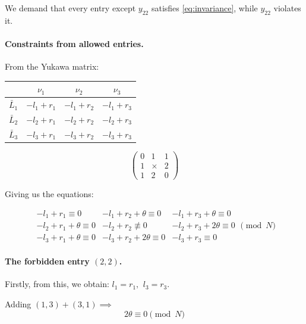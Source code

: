 We demand that every entry except $y_{22}$ satisfies \eqref{eq:invariance}, while $y_{22}$ violates it.


\paragraph{Constraints from allowed entries.}
From the Yukawa matrix: 

\begin{table}[h]
\centering
\begin{tabular}{ c | c | c | c } 
  \,\ &  $\nu_1$ &  $\nu_2$ &  $\nu_3$  \\ 
  \hline
  $\bar{L}_1$ & $-l_1 + r_1$ & $-l_1 + r_2$ & $-l_1 + r_3$  \\ 
  \hline
  $\bar{L}_2$ &  $-l_2 + r_1$  & $-l_2 + r_2$ & $-l_2 + r_3$ \\ 
  \hline
  $\bar{L}_3$ &  $-l_3 + r_1$ &  $-l_3 + r_2$ & $-l_3 + r_3$ 
\end{tabular}
\end{table} 
\begin{equation}
    \begin{pmatrix}
        0 & 1 & 1 \\ 
        1 & \times & 2 \\
        1 & 2 & 0
    \end{pmatrix}
\end{equation}

Giving us the equations: 

\begin{equation}
\begin{array}{c|c|c}
  -l_1 + r_1 \equiv 0& -l_1 + r_2 + \theta \equiv0 & -l_1 + r_3 + \theta \equiv 0 \\
  \hline
  -l_2 + r_1 + \theta \equiv 0 & -l_2 + r_2 \not\equiv 0 & -l_2 + r_3 + 2\theta \equiv 0\\
  \hline
  -l_3 + r_1 + \theta \equiv 0 & -l_3 + r_2+ 2\theta \equiv 0 & -l_3 + r_3 \equiv 0
\end{array} 
    \pmod N
\end{equation}

\paragraph{The forbidden entry $(2,2)$.}
Firstly, from this, we obtain: $l_1 = r_1,\,\ l_3 = r_3$.

Adding $(1,3) + (3,1) \implies$
\begin{equation}
    2 \theta \equiv 0 \pmod N
\end{equation}

